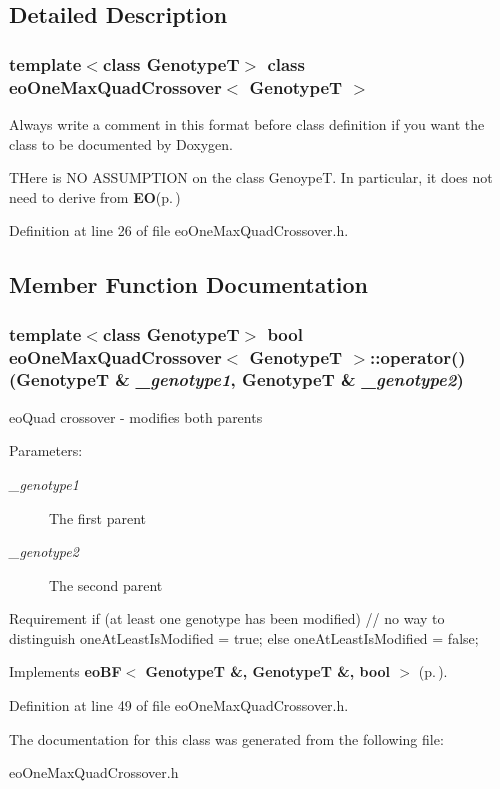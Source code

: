 \subsection{Detailed Description}
\subsubsection*{template$<$class Genotype\-T$>$ class eo\-One\-Max\-Quad\-Crossover$<$ Genotype\-T $>$}

Always write a comment in this format before class definition if you want the class to be documented by Doxygen. 

THere is NO ASSUMPTION on the class Genoype\-T. In particular, it does not need to derive from {\bf EO}{\rm (p.\,\pageref{class_e_o})} 



Definition at line 26 of file eo\-One\-Max\-Quad\-Crossover.h.

\subsection{Member Function Documentation}
\subsubsection{\setlength{\rightskip}{0pt plus 5cm}template$<$class Genotype\-T$>$ bool {\bf eo\-One\-Max\-Quad\-Crossover}$<$ Genotype\-T $>$::operator() (Genotype\-T \& {\em \_\-genotype1}, Genotype\-T \& {\em \_\-genotype2})\hspace{0.3cm}{\tt  [inline, virtual]}}\label{classeo_one_max_quad_crossover_a2}


eo\-Quad crossover - modifies both parents 

\begin{Desc}
\item[Parameters:]
\begin{description}
\item[{\em \_\-genotype1}]The first parent \item[{\em \_\-genotype2}]The second parent\end{description}
\end{Desc}


Requirement if (at least one genotype has been modified) // no way to distinguish one\-At\-Least\-Is\-Modified = true; else one\-At\-Least\-Is\-Modified = false; 

Implements {\bf eo\-BF$<$ Genotype\-T \&, Genotype\-T \&, bool $>$} {\rm (p.\,\pageref{classeo_b_f_a1})}.

Definition at line 49 of file eo\-One\-Max\-Quad\-Crossover.h.

The documentation for this class was generated from the following file:\begin{CompactItemize}
\item 
eo\-One\-Max\-Quad\-Crossover.h\end{CompactItemize}
